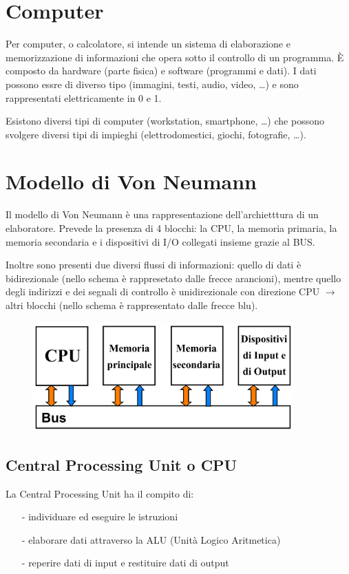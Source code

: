 \documentclass{article}
\begin{document}
\newpage


\section{Computer}
Per computer, o calcolatore, si intende un sistema di elaborazione e memorizzazione di informazioni che opera sotto
il controllo di un programma. È composto da hardware (parte fisica) e software (programmi e dati). I dati possono
essre di diverso tipo (immagini, testi, audio, video, \dots) e sono rappresentati elettricamente in 0 e 1.

Esistono diversi tipi di computer (workstation, smartphone, \dots) che possono svolgere diversi tipi di impieghi
(elettrodomestici, giochi, fotografie, \dots).


\section{Modello di Von Neumann}
Il modello di Von Neumann è una rappresentazione dell'archietttura di un elaboratore. Prevede la presenza di 4 blocchi:
la CPU, la memoria primaria, la memoria secondaria e i dispositivi di I/O collegati insieme grazie al BUS.

Inoltre sono presenti due diversi flussi di informazioni: quello di dati è bidirezionale (nello schema è rappresetato
dalle frecce arancioni), mentre quello degli indirizzi e dei segnali di controllo è unidirezionale con direzione CPU
\(\rightarrow\) altri blocchi (nello schema è rappresentato dalle frecce blu).

\begin{figure}[h]
	\centering
	\includegraphics[width=10cm]{von-neumann-scheme.png}
\end{figure}

\subsection{Central Processing Unit o CPU}
La Central Processing Unit ha il compito di:
\begin{itemize}[topsep=3pt, itemsep=0pt]
	\item[-] individuare ed eseguire le istruzioni
	\item[-] elaborare dati attraverso la ALU (Unità Logico Aritmetica)
	\item[-] reperire dati di input e restituire dati di output
\end{itemize}
\end{document}
